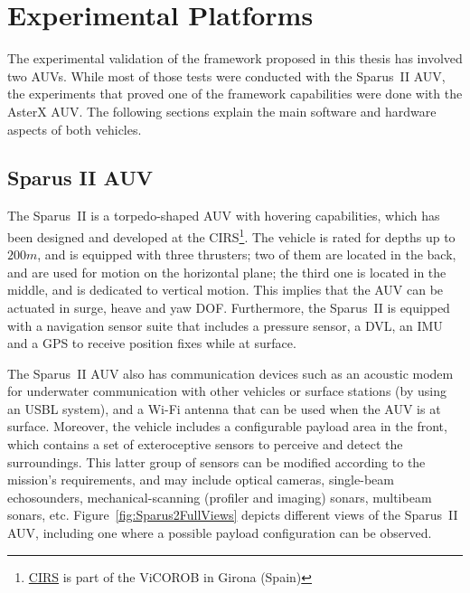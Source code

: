 
\chapter{Experimental Platforms}
\label{appx:exp_platform}

\ifpdf
    \graphicspath{{A_experimental_platform/figures/PNG/}{A_experimental_platform/figures/PDF/}{A_experimental_platform/figures/}}
\else
    \graphicspath{{A_experimental_platform/figures/EPS/}{A_experimental_platform/figures/}}
\fi



The experimental validation of the framework proposed in this thesis has
involved two \acp{AUV}. While most of those tests were conducted with the
Sparus~II \ac{AUV}, the experiments that proved one of the framework
capabilities were done with the AsterX \ac{AUV}. The following sections explain
the main software and hardware aspects of both vehicles.

\section{Sparus II AUV}

The Sparus~II is a torpedo-shaped \ac{AUV} with hovering capabilities, which has
been designed and developed at the
\ac{CIRS}\footnote{\href{http://cirs.udg.edu/}{CIRS} is part of the \ac{ViCOROB}
in Girona (Spain)}. The vehicle is rated for depths up to $200 m$, and is
equipped with three thrusters; two of them are located in the back, and are used
for motion on the horizontal plane; the third one is located in the middle, and
is dedicated to vertical motion. This implies that the \ac{AUV} can be actuated
in surge, heave and yaw \ac{DOF}. Furthermore, the Sparus~II is equipped with a
navigation sensor suite that includes a pressure sensor, a \acf{DVL}, an
\acf{IMU} and a GPS to receive position fixes while at surface. 

The Sparus~II \ac{AUV} also has communication devices such as an acoustic modem
for underwater communication with other vehicles or surface stations (\eg by
using an \ac{USBL} system), and a Wi-Fi antenna that can be used when the
\ac{AUV} is at surface. Moreover, the vehicle includes a configurable payload
area in the front, which contains a set of exteroceptive sensors to perceive and
detect the surroundings. This latter group of sensors can be modified according
to the mission's requirements, and may include optical cameras, single-beam
echosounders, mechanical-scanning (profiler and imaging) sonars, multibeam
sonars, etc. Figure~\ref{fig:Sparus2FullViews} depicts different views of the
Sparus~II \ac{AUV}, including one where a possible payload configuration can be
observed.


